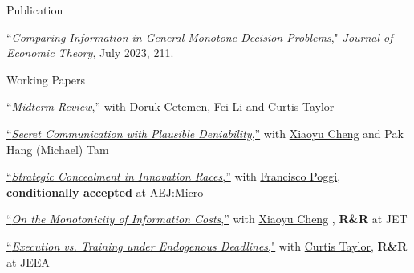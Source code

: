 \begin{rSection}{Publication}
	
	\begin{etaremune}
		\item \href{https://yonggyun-yg-kim.github.io/files/Research%20papers/GMDP_JET.pdf}{``\textit{Comparing Information in General Monotone Decision Problems},"} 
		\textit{Journal of Economic Theory}, July 2023, 211. 
		
	\end{etaremune}
	
	
	
\end{rSection}

\begin{rSection}{Working Papers}
	
	\begin{etaremune}
		
		\item 
		\href{https://yonggyun-yg-kim.github.io/files/Research%20papers/Midterm_Review/Midterm_Review.pdf}{``\textit{Midterm Review},''}
		 with \href{https://sites.google.com/site/dorukcetemen/}{Doruk Cetemen}, \href{https://lifei.weebly.com/}{Fei Li} and \href{https://sites.google.com/view/curtistaylor/home}{Curtis Taylor}
		
		\item \href{https://yonggyun-yg-kim.github.io/files/Research%20papers/SCPD.pdf}{``\textit{Secret Communication with Plausible Deniability},''} with \href{https://xiaoyu-cheng.com/}{Xiaoyu Cheng} and Pak Hang (Michael) Tam 
		
		\item  \href{https://yonggyun-yg-kim.github.io/files/Research%20papers/SCIR_public.pdf}{``\textit{Strategic Concealment in Innovation Races},''}   with \href{https://www.franciscopoggi.com/}{Francisco Poggi}, \textbf{conditionally accepted} at AEJ:Micro
		
		\item
		 \href{https://yonggyun-yg-kim.github.io/files/Research%20papers/BLmonotonicity.pdf}{``\textit{On the Monotonicity of Information Costs},''} with \href{https://xiaoyu-cheng.com/}{Xiaoyu Cheng}%
		, \textbf{R\&R} at JET
		
		
		
		\item \href{https://yonggyun-yg-kim.github.io/files/Research%20papers/Execution-v-Training.pdf}{``\textit{Execution vs. Training under Endogenous Deadlines},"} with \href{https://sites.google.com/view/curtistaylor/home}{Curtis Taylor}, \textbf{R\&R} at JEEA
	\end{etaremune}
	
	
\end{rSection}


